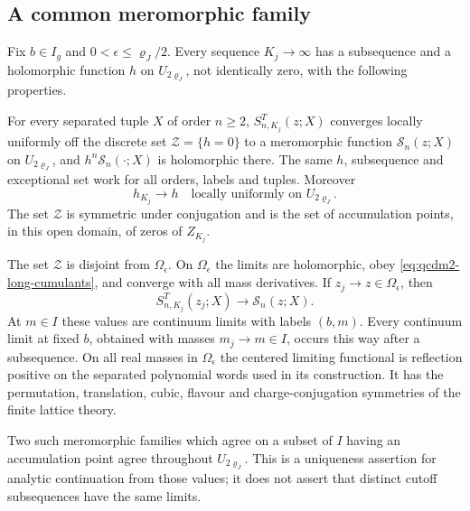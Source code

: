 \documentclass[11pt,letterpaper,reqno]{amsart}
\makeatletter
\theoremstyle{definition}
\newcommand{\ms@majorstart}{%
  \pushQED{\qed}\renewcommand{\qedsymbol}{$\blacksquare\square$}}
\newenvironment{theorem}[1][]{\ms@majorstart\ms@theorem[#1]}
  {\popQED\endms@theorem}
\theoremstyle{remark}
\makeatother
\begin{document}
\subsection{A common meromorphic family}

\begin{theorem}[Continuation in the mass]
\label{C-404-60}\label{C-404-73}
Fix \(b\in I_g\) and \(0<\epsilon\le\varrho_J/2\).
Every sequence \(K_j\to\infty\) has a subsequence and a
holomorphic function \(h\) on \(U_{2\varrho_J}\), not
identically zero, with the following properties.

For every separated tuple \(X\) of order \(n\ge2\),
\(S^T_{n,K_j}(z;X)\) converges locally uniformly off the
discrete set \(\mathcal Z=\{h=0\}\) to a meromorphic
function \(\mathcal S_n(z;X)\) on \(U_{2\varrho_J}\), and
\(h^n\mathcal S_n(\cdot;X)\) is holomorphic there.
The same \(h\), subsequence and exceptional set work for all
orders, labels and tuples. Moreover
\[
 h_{K_j}\longrightarrow h
        \quad\text{locally uniformly on }U_{2\varrho_J}.
\]
The set \(\mathcal Z\) is symmetric under conjugation and
is the set of accumulation points, in this open domain,
of zeros of \(Z_{K_j}\).

The set \(\mathcal Z\) is disjoint from \(\Omega_\epsilon\).
On \(\Omega_\epsilon\) the limits are holomorphic, obey
\eqref{eq:qcdm2-long-cumulants}, and converge with all mass
derivatives. If \(z_j\to z\in\Omega_\epsilon\), then
\[
 S^T_{n,K_j}(z_j;X)\longrightarrow\mathcal S_n(z;X).
\]
At \(m\in I\) these values are continuum limits with labels
\((b,m)\). Every continuum limit at fixed \(b\), obtained
with masses \(m_j\to m\in I\), occurs this way after a
subsequence. On all real masses in \(\Omega_\epsilon\)
the centered limiting functional is reflection positive on
the separated polynomial words used in its construction.
It has the permutation, translation, cubic, flavour and
charge-conjugation symmetries of the finite lattice theory.

Two such meromorphic families which agree on a subset of
\(I\) having an accumulation point agree throughout
\(U_{2\varrho_J}\). This is a uniqueness assertion for
analytic continuation from those values; it does not assert
that distinct cutoff subsequences have the same limits.
\end{theorem}
\end{document}
